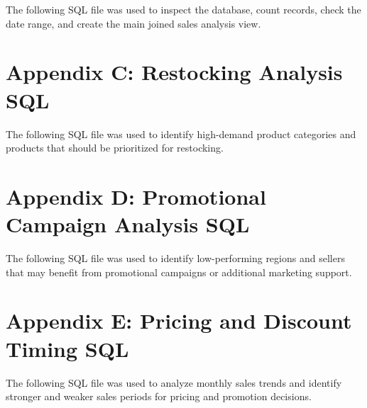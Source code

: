 \documentclass[12pt]{article}
\begin{document}
The following SQL file was used to inspect the database, count records, check the
date range, and create the main joined sales analysis view.




\newpage
\section{Appendix C: Restocking Analysis SQL}

The following SQL file was used to identify high-demand product categories and
products that should be prioritized for restocking.




\newpage
\section{Appendix D: Promotional Campaign Analysis SQL}

The following SQL file was used to identify low-performing regions and sellers
that may benefit from promotional campaigns or additional marketing support.




\newpage
\section{Appendix E: Pricing and Discount Timing SQL}

The following SQL file was used to analyze monthly sales trends and identify
stronger and weaker sales periods for pricing and promotion decisions.


\end{document}
